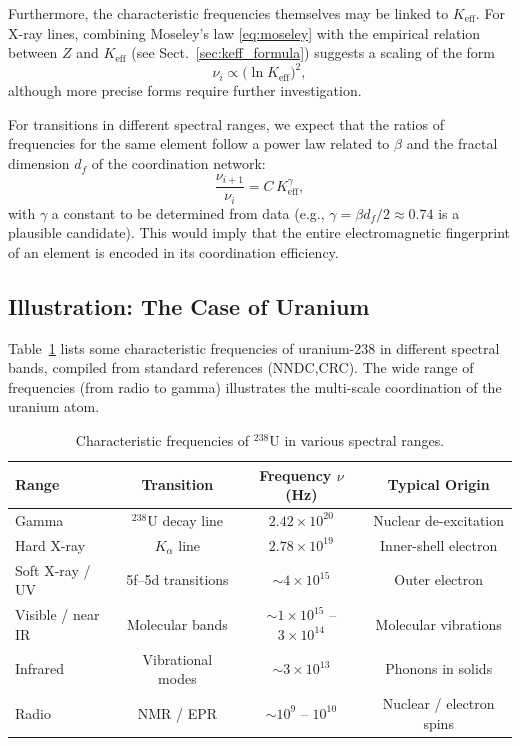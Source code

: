\documentclass[12pt,a4paper]{article}
\theoremstyle{remark}
\begin{document}
	Furthermore, the characteristic frequencies themselves may be linked to \(K_{\mathrm{eff}}\). For X-ray lines, combining Moseley's law \eqref{eq:moseley} with the empirical relation between \(Z\) and \(K_{\mathrm{eff}}\) (see Sect.~\ref{sec:keff_formula}) suggests a scaling of the form
	\begin{equation}
		\nu_i \propto \bigl(\ln K_{\mathrm{eff}}\bigr)^2,
		\label{eq:freq_scaling}
	\end{equation}
	although more precise forms require further investigation.
	
	For transitions in different spectral ranges, we expect that the ratios of frequencies for the same element follow a power law related to \(\beta\) and the fractal dimension \(d_f\) of the coordination network:
	\begin{equation}
		\frac{\nu_{i+1}}{\nu_i} = C \, K_{\mathrm{eff}}^{\gamma},
		\label{eq:ratio_scaling}
	\end{equation}
	with \(\gamma\) a constant to be determined from data (e.g., \(\gamma = \beta d_f/2 \approx 0.74\) is a plausible candidate). This would imply that the entire electromagnetic fingerprint of an element is encoded in its coordination efficiency.
	
	\subsection{Illustration: The Case of Uranium}
	
	Table~\ref{tab:uranium_spectrum} lists some characteristic frequencies of uranium-238 in different spectral bands, compiled from standard references (NNDC,CRC). The wide range of frequencies (from radio to gamma) illustrates the multi-scale coordination of the uranium atom.
	
	\begin{table}[htbp]
		\centering
		\caption{Characteristic frequencies of \(^{238}\mathrm{U}\) in various spectral ranges.}
		\label{tab:uranium_spectrum}
		\begin{tabular}{@{}lccc@{}}
			\toprule
			\textbf{Range} & \textbf{Transition} & \textbf{Frequency \(\nu\) (Hz)} & \textbf{Typical Origin} \\
			\midrule
			Gamma & \(^{238}\mathrm{U}\) decay line & \(2.42\times10^{20}\) & Nuclear de-excitation \\
			Hard X-ray & \(K_\alpha\) line & \(2.78\times10^{19}\) & Inner-shell electron \\
			Soft X-ray / UV & 5f–5d transitions & \(\sim 4\times10^{15}\) & Outer electron \\
			Visible / near IR & Molecular bands & \(\sim 1\times10^{15}\) – \(3\times10^{14}\) & Molecular vibrations \\
			Infrared & Vibrational modes & \(\sim 3\times10^{13}\) & Phonons in solids \\
			Radio & NMR / EPR & \(\sim 10^9\) – \(10^{10}\) & Nuclear / electron spins \\
			\bottomrule
		\end{tabular}
	\end{table}
	
\end{document}

